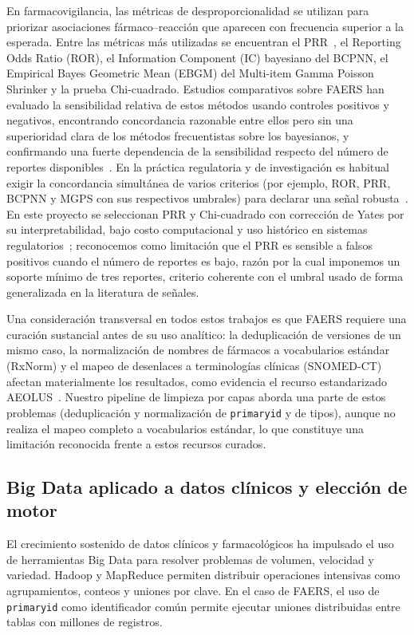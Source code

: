 \documentclass[12pt,a4paper]{article}
\begin{document}
En farmacovigilancia, las métricas de desproporcionalidad se utilizan para priorizar asociaciones fármaco--reacción que aparecen con frecuencia superior a la esperada. Entre las métricas más utilizadas se encuentran el PRR~\cite{evans2001}, el Reporting Odds Ratio (ROR), el Information Component (IC) bayesiano del BCPNN, el Empirical Bayes Geometric Mean (EBGM) del Multi-item Gamma Poisson Shrinker y la prueba Chi-cuadrado. Estudios comparativos sobre FAERS han evaluado la sensibilidad relativa de estos métodos usando controles positivos y negativos, encontrando concordancia razonable entre ellos pero sin una superioridad clara de los métodos frecuentistas sobre los bayesianos, y confirmando una fuerte dependencia de la sensibilidad respecto del número de reportes disponibles~\cite{disproportionalityAssessment2015}. En la práctica regulatoria y de investigación es habitual exigir la concordancia simultánea de varios criterios (por ejemplo, ROR, PRR, BCPNN y MGPS con sus respectivos umbrales) para declarar una señal robusta~\cite{ticagrelorFaers2024,il1faers2024}. En este proyecto se seleccionan PRR y Chi-cuadrado con corrección de Yates por su interpretabilidad, bajo costo computacional y uso histórico en sistemas regulatorios~\cite{ema2006}; reconocemos como limitación que el PRR es sensible a falsos positivos cuando el número de reportes es bajo, razón por la cual imponemos un soporte mínimo de tres reportes, criterio coherente con el umbral usado de forma generalizada en la literatura de señales.

Una consideración transversal en todos estos trabajos es que FAERS requiere una curación sustancial antes de su uso analítico: la deduplicación de versiones de un mismo caso, la normalización de nombres de fármacos a vocabularios estándar (RxNorm) y el mapeo de desenlaces a terminologías clínicas (SNOMED-CT) afectan materialmente los resultados, como evidencia el recurso estandarizado AEOLUS~\cite{banda2016}. Nuestro pipeline de limpieza por capas aborda una parte de estos problemas (deduplicación y normalización de \texttt{primaryid} y de tipos), aunque no realiza el mapeo completo a vocabularios estándar, lo que constituye una limitación reconocida frente a estos recursos curados.

\subsection{Big Data aplicado a datos clínicos y elección de motor}
El crecimiento sostenido de datos clínicos y farmacológicos ha impulsado el uso de herramientas Big Data para resolver problemas de volumen, velocidad y variedad. Hadoop y MapReduce permiten distribuir operaciones intensivas como agrupamientos, conteos y uniones por clave. En el caso de FAERS, el uso de \texttt{primaryid} como identificador común permite ejecutar uniones distribuidas entre tablas con millones de registros.
\end{document}
